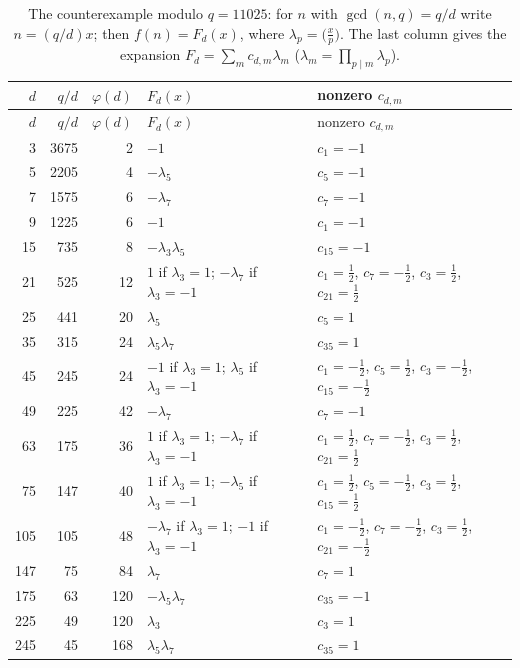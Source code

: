 \documentclass[11pt]{amsart}
\theoremstyle{definition}
\theoremstyle{remark}
\numberwithin{equation}{section}
\begin{document}
\begin{longtable}{rrrll}
\caption{The counterexample modulo $q=11025$: for $n$ with $\gcd(n,q)=q/d$ write $n=(q/d)x$; then $f(n)=F_d(x)$, where $\lambda_p=\bigl(\tfrac{x}{p}\bigr)$. The last column gives the expansion $F_d=\sum_m c_{d,m}\lambda_m$ ($\lambda_m=\prod_{p\mid m}\lambda_p$).}\label{tab:11025}\\
\toprule $d$ & $q/d$ & $\varphi(d)$ & $F_d(x)$ & nonzero $c_{d,m}$\\ \midrule\endfirsthead
\toprule $d$ & $q/d$ & $\varphi(d)$ & $F_d(x)$ & nonzero $c_{d,m}$\\ \midrule\endhead
3 & 3675 & 2 & $-1$ & $c_{1}=-1$\\
5 & 2205 & 4 & $-\lambda_5$ & $c_{5}=-1$\\
7 & 1575 & 6 & $-\lambda_7$ & $c_{7}=-1$\\
9 & 1225 & 6 & $-1$ & $c_{1}=-1$\\
15 & 735 & 8 & $-\lambda_3\lambda_5$ & $c_{15}=-1$\\
21 & 525 & 12 & $1$ if $\lambda_3=1$; $-\lambda_7$ if $\lambda_3=-1$ & $c_{1}=\tfrac{1}{2}$, $c_{7}=-\tfrac{1}{2}$, $c_{3}=\tfrac{1}{2}$, $c_{21}=\tfrac{1}{2}$\\
25 & 441 & 20 & $\lambda_5$ & $c_{5}=1$\\
35 & 315 & 24 & $\lambda_5\lambda_7$ & $c_{35}=1$\\
45 & 245 & 24 & $-1$ if $\lambda_3=1$; $\lambda_5$ if $\lambda_3=-1$ & $c_{1}=-\tfrac{1}{2}$, $c_{5}=\tfrac{1}{2}$, $c_{3}=-\tfrac{1}{2}$, $c_{15}=-\tfrac{1}{2}$\\
49 & 225 & 42 & $-\lambda_7$ & $c_{7}=-1$\\
63 & 175 & 36 & $1$ if $\lambda_3=1$; $-\lambda_7$ if $\lambda_3=-1$ & $c_{1}=\tfrac{1}{2}$, $c_{7}=-\tfrac{1}{2}$, $c_{3}=\tfrac{1}{2}$, $c_{21}=\tfrac{1}{2}$\\
75 & 147 & 40 & $1$ if $\lambda_3=1$; $-\lambda_5$ if $\lambda_3=-1$ & $c_{1}=\tfrac{1}{2}$, $c_{5}=-\tfrac{1}{2}$, $c_{3}=\tfrac{1}{2}$, $c_{15}=\tfrac{1}{2}$\\
105 & 105 & 48 & $-\lambda_7$ if $\lambda_3=1$; $-1$ if $\lambda_3=-1$ & $c_{1}=-\tfrac{1}{2}$, $c_{7}=-\tfrac{1}{2}$, $c_{3}=\tfrac{1}{2}$, $c_{21}=-\tfrac{1}{2}$\\
147 & 75 & 84 & $\lambda_7$ & $c_{7}=1$\\
175 & 63 & 120 & $-\lambda_5\lambda_7$ & $c_{35}=-1$\\
225 & 49 & 120 & $\lambda_3$ & $c_{3}=1$\\
245 & 45 & 168 & $\lambda_5\lambda_7$ & $c_{35}=1$\\

\end{longtable}
\end{document}
